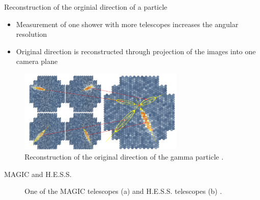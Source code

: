\documentclass[aspectratio=1610, 10pt]{beamer}
\begin{document}
\begin{frame}{Reconstruction of the orginial direction of a particle}
  \begin{itemize}
    \item Measurement of one shower with more telescopes increases the angular resolution
    \medskip
    \item Original direction is reconstructed through projection of the images into one camera plane
  \end{itemize}
  \begin{figure}
    \includegraphics[width=0.7\textwidth]{images/reconstruction.png}
    \caption{Reconstruction of the original direction of the gamma particle \cite{iact}.}
  \end{figure}
\end{frame}

\begin{frame}{MAGIC and H.E.S.S.}
  \begin{figure}
      \hspace{0.5cm}
  \caption{One of the MAGIC telescopes (a) and H.E.S.S. telescopes (b) \cite{hess}.}
  \end{figure}
\end{frame}
\end{document}
